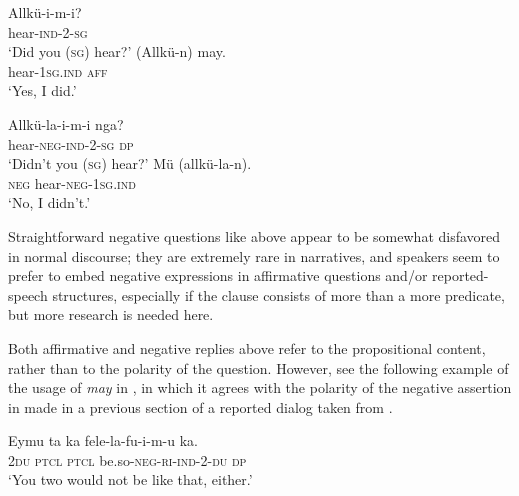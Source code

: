 \documentclass[output=paper,colorlinks,citecolor=brown,draft]{langscibook}
\begin{document}
\ea\label{ex:mapu:19}
    \ea\label{ex:mapu:19a}
        \begin{xlist}
        \label{ex:mapu:19a1}
            \gll Allkü-i-m-i? \\ 
                 hear-\textsc{ind-2-sg} \\
            \glt ‘Did you (\textsc{sg}) hear?’ 
        \label{ex:mapu:19a2}
            \gll (Allkü-n) may. \\ 
                 hear-\textsc{1sg.ind} \textsc{aff} \\
            \glt ‘Yes, I did.’ \citep[166]{Moesbach1962}
        \end{xlist}
    \ex\label{ex:mapu:19b}
        \begin{xlist}
        \label{ex:mapu:19b1}
            \gll Allkü-la-i-m-i nga? \\
                 hear-\textsc{neg-ind-2-sg} \textsc{dp} \\
            \glt ‘Didn’t you (\textsc{sg}) hear?’
        \label{ex:mapu:19b2}
            \gll Mü  (allkü-la-n). \\
                 \textsc{neg} hear-\textsc{neg-1sg.ind} \\
            \glt ‘No, I didn’t.’ \citep[166]{Moesbach1962} 
        \end{xlist}
    \z 
\z

Straightforward negative questions like  above appear to be somewhat disfavored in normal discourse; they are extremely rare in narratives, and speakers seem to prefer to embed negative expressions in affirmative questions and/or reported-speech structures, especially if the clause consists of more than a more predicate, but more research is needed here.

Both affirmative and negative replies above refer to the propositional content, rather than to the polarity of the question. However, see the following example of the usage of \textit{may} in , in which it agrees with the polarity of the negative assertion in  made in a previous section of a reported dialog taken from \citet[226--227]{Salas2006}.


\ea\label{ex:mapu:20}    
    \ea\label{ex:mapu:20a}
        \gll Eymu  ta  ka  fele-la-fu-i-m-u    ka. \\ 
             \textsc{2du} \textsc{ptcl} \textsc{ptcl} be.so-\textsc{neg-ri-ind-2-du} \textsc{dp} \\
        \glt ‘You two would not be like that, either.’
   
\end{document}
